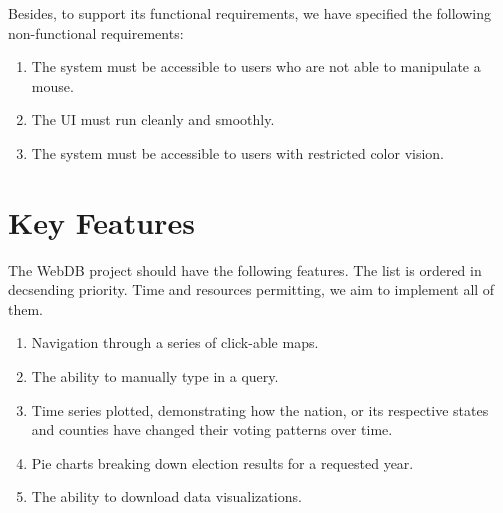 \documentclass[12pt]{article}
\begin{document}
Besides, to support its functional requirements, we have specified the following non-functional requirements:
\begin{enumerate}
 \item The system must be accessible to users who are not able to manipulate a mouse.
 \item The UI must run cleanly and smoothly.
 \item The system must be accessible to users with restricted color vision.
\end{enumerate}

\section{Key Features}
The WebDB project should have the following features. The list is ordered in decsending priority. Time and resources
permitting, we aim to implement all of them.
\begin{enumerate}
 \item Navigation through a series of click-able maps.
 \item The ability to manually type in a query.
 \item Time series plotted, demonstrating how the nation, or its respective states and counties have changed their voting patterns over time.
 \item Pie charts breaking down election results for a requested year. 
 \item The ability to download data visualizations.
\end{enumerate}
\end{document}
